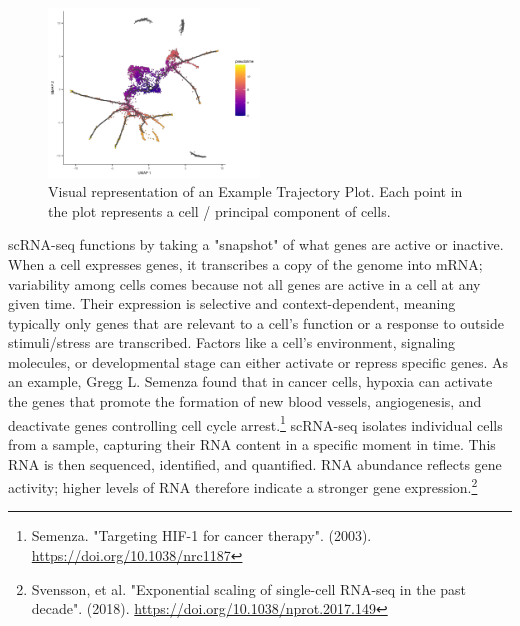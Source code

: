\documentclass{article}
\begin{document}
\begin{figure}[h]
\centering
\includegraphics[width=0.5\textwidth]{./images/umap.png}
\caption{Visual representation of an Example Trajectory Plot. Each point in the plot represents a cell / principal component of cells.}
\end{figure}

scRNA-seq functions by taking a "snapshot" of what genes are active or inactive. When a cell expresses genes, it transcribes a copy of the genome into mRNA; variability among cells comes because not all genes are active in a cell at any given time. Their expression is selective and context-dependent, meaning typically only genes that are relevant to a cell's function or a response to outside stimuli/stress are transcribed. Factors like a cell's environment, signaling molecules, or developmental stage can either activate or repress specific genes. As an example, Gregg L. Semenza found that in cancer cells, hypoxia can activate the genes that promote the formation of new blood vessels, angiogenesis, and deactivate genes controlling cell cycle arrest.\footnote{Semenza. "Targeting HIF-1 for cancer therapy". (2003). \url{https://doi.org/10.1038/nrc1187}} scRNA-seq isolates individual cells from a sample, capturing their RNA content in a specific moment in time. This RNA is then sequenced, identified, and quantified. RNA abundance reflects gene activity; higher levels of RNA therefore indicate a stronger gene expression.\footnote{Svensson, et al. "Exponential scaling of single-cell RNA-seq in the past decade". (2018). \url{https://doi.org/10.1038/nprot.2017.149}}
\end{document}
